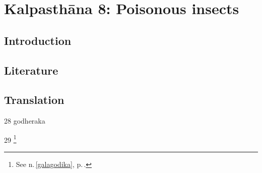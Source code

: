 \chapter{Kalpasthāna 8: Poisonous insects}

\section{Introduction} 


    
    

\section{Literature} 

\section{Translation}

\begin{translation}

\item [28]  \gls{godheraka}    \label{godheraka}
    
\item [29] \footnote{See n.\,\ref{galagodika}, 
p.\,\pageref{galagodika}.}
 
\end{translation}